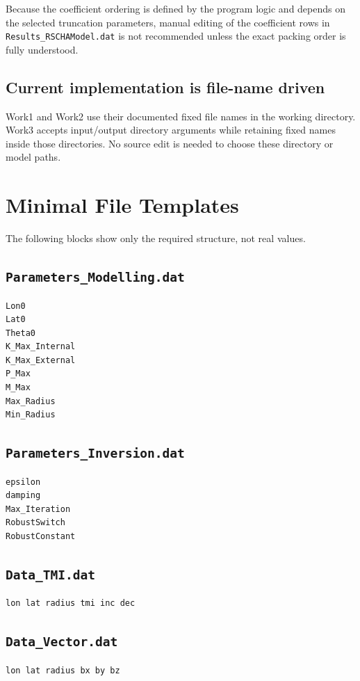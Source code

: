 \documentclass[11pt,a4paper]{article}
\begin{document}
Because the coefficient ordering is defined by the program logic and depends on the selected truncation parameters, manual editing of the coefficient rows in \texttt{Results\_RSCHAModel.dat} is not recommended unless the exact packing order is fully understood.

\subsection{Current implementation is file-name driven}

Work1 and Work2 use their documented fixed file names in the working directory. Work3 accepts input/output directory arguments while retaining fixed names inside those directories. No source edit is needed to choose these directory or model paths.

\section{Minimal File Templates}

The following blocks show only the required structure, not real values.

\subsection*{\texttt{Parameters\_Modelling.dat}}
\begin{lstlisting}[style=plaincode]
Lon0
Lat0
Theta0
K_Max_Internal
K_Max_External
P_Max
M_Max
Max_Radius
Min_Radius
\end{lstlisting}

\subsection*{\texttt{Parameters\_Inversion.dat}}
\begin{lstlisting}[style=plaincode]
epsilon
damping
Max_Iteration
RobustSwitch
RobustConstant
\end{lstlisting}

\subsection*{\texttt{Data\_TMI.dat}}
\begin{lstlisting}[style=plaincode]
lon lat radius tmi inc dec
\end{lstlisting}

\subsection*{\texttt{Data\_Vector.dat}}
\begin{lstlisting}[style=plaincode]
lon lat radius bx by bz
\end{lstlisting}
\end{document}
